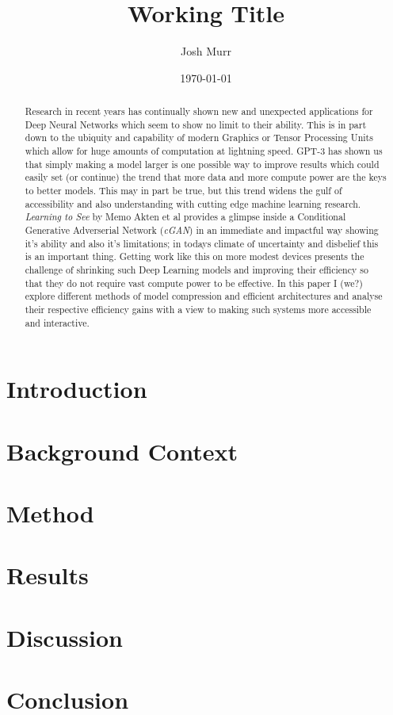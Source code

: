 \documentclass[a4paper]{article}
\title{ Working Title }
\date{\today}
\author{Josh Murr}
\begin{document}
\maketitle

\begin{abstract}
  Research in recent years has continually shown new and unexpected applications for Deep Neural Networks which seem to show no limit to their ability. This is in part down to the ubiquity and capability of modern Graphics or Tensor Processing Units which allow for huge amounts of computation at lightning speed. GPT-3 has shown us that simply making a model larger is one possible way to improve results\cite{2005.14165} which could easily set (or continue) the trend that more data and more compute power are the keys to better models. This may in part be true, but this trend widens the gulf of accessibility and also understanding with cutting edge machine learning research. \textit{Learning to See} by Memo Akten et al\cite{2003.00902} provides a glimpse inside a Conditional Generative Adverserial Network (\textit{cGAN}) in an immediate and impactful way showing it's ability and also it's limitations; in todays climate of uncertainty and disbelief this is an important thing. Getting work like this on more modest devices presents the challenge of shrinking such Deep Learning models and improving their efficiency so that they do not require vast compute power to be effective. In this paper I (we?) explore different methods of model compression and efficient architectures and analyse their respective efficiency gains with a view to making such systems more accessible and interactive.
\end{abstract}

\section{Introduction}

\nocite{*}

\section{Background Context}

\section{Method}

\section{Results}

\section{Discussion}

\section{Conclusion}


\medskip
\printbibliography
\end{document}
